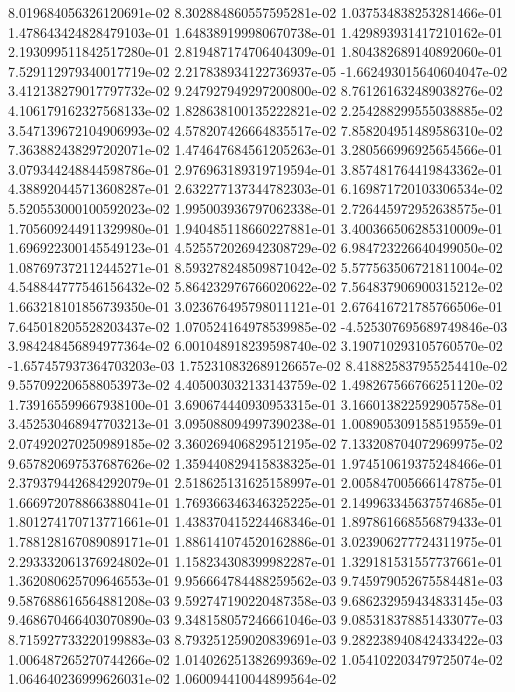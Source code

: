 8.019684056326120691e-02
8.302884860557595281e-02
1.037534838253281466e-01
1.478643424828479103e-01
1.648389199980670738e-01
1.429893931417210162e-01
2.193099511842517280e-01
2.819487174706404309e-01
1.804382689140892060e-01
7.529112979340017719e-02
2.217838934122736937e-05
-1.662493015640604047e-02
3.412138279017797732e-02
9.247927949297200800e-02
8.761261632489038276e-02
4.106179162327568133e-02
1.828638100135222821e-02
2.254288299555038885e-02
3.547139672104906993e-02
4.578207426664835517e-02
7.858204951489586310e-02
7.363882438297202071e-02
1.474647684561205263e-01
3.280566996925654566e-01
3.079344248844598786e-01
2.976963189319719594e-01
3.857481764419843362e-01
4.388920445713608287e-01
2.632277137344782303e-01
6.169871720103306534e-02
5.520553000100592023e-02
1.995003936797062338e-01
2.726445972952638575e-01
1.705609244911329980e-01
1.940485118660227881e-01
3.400366506285310009e-01
1.696922300145549123e-01
4.525572026942308729e-02
6.984723226640499050e-02
1.087697372112445271e-01
8.593278248509871042e-02
5.577563506721811004e-02
4.548844777546156432e-02
5.864232976766020622e-02
7.564837906900315212e-02
1.663218101856739350e-01
3.023676495798011121e-01
2.676416721785766506e-01
7.645018205528203437e-02
1.070524164978539985e-02
-4.525307695689749846e-03
3.984248456894977364e-02
6.001048918239598740e-02
3.190710293105760570e-02
-1.657457937364703203e-03
1.752310832689126657e-02
8.418825837955254410e-02
9.557092206588053973e-02
4.405003032133143759e-02
1.498267566766251120e-02
1.739165599667938100e-01
3.690674440930953315e-01
3.166013822592905758e-01
3.452530468947703213e-01
3.095088094997390238e-01
1.008905309158519559e-01
2.074920270250989185e-02
3.360269406829512195e-02
7.133208704072969975e-02
9.657820697537687626e-02
1.359440829415838325e-01
1.974510619375248466e-01
2.379379442684292079e-01
2.518625131625158997e-01
2.005847005666147875e-01
1.666972078866388041e-01
1.769366346346325225e-01
2.149963345637574685e-01
1.801274170713771661e-01
1.438370415224468346e-01
1.897861668556879433e-01
1.788128167089089171e-01
1.886141074520162886e-01
3.023906277724311975e-01
2.293332061376924802e-01
1.158234308399982287e-01
1.329181531557737661e-01
1.362080625709646553e-01
9.956664784488259562e-03
9.745979052675584481e-03
9.587688616564881208e-03
9.592747190220487358e-03
9.686232959434833145e-03
9.468670466403070890e-03
9.348158057246661046e-03
9.085318378851433077e-03
8.715927733220199883e-03
8.793251259020839691e-03
9.282238940842433422e-03
1.006487265270744266e-02
1.014026251382699369e-02
1.054102203479725074e-02
1.064640236999626031e-02
1.060094410044899564e-02
